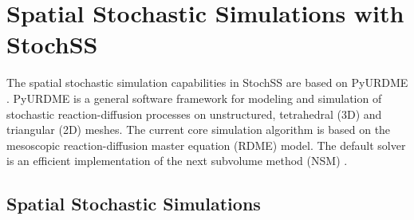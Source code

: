 \chapter{Spatial Stochastic Simulations with StochSS}




The spatial stochastic simulation capabilities in StochSS are based on PyURDME \cite{urdme}. PyURDME is a general software framework for modeling and simulation of stochastic reaction-diffusion processes on unstructured, tetrahedral (3D) and triangular (2D) meshes. The current core simulation algorithm is based on the mesoscopic reaction-diffusion master equation (RDME) model. The default solver is an efficient implementation of the next subvolume method (NSM) \cite{nsm}.

\section{Spatial Stochastic Simulations}

